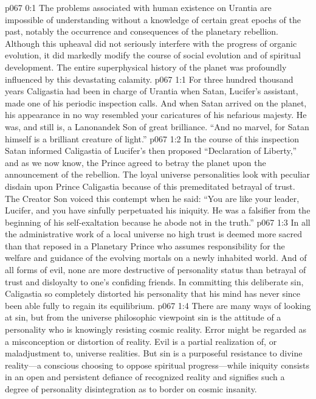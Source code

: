 \author{Melchizedek}
\vs p067 0:1 The problems associated with human existence on Urantia are impossible of understanding without a knowledge of certain great epochs of the past, notably the occurrence and consequences of the planetary rebellion. Although this upheaval did not seriously interfere with the progress of organic evolution, it did markedly modify the course of social evolution and of spiritual development. The entire superphysical history of the planet was profoundly influenced by this devastating calamity.
\vs p067 1:1 For three hundred thousand years Caligastia had been in charge of Urantia when Satan, Lucifer’s assistant, made one of his periodic inspection calls. And when Satan arrived on the planet, his appearance in no way resembled your caricatures of his nefarious majesty. He was, and still is, a Lanonandek Son of great brilliance. “And no marvel, for Satan himself is a brilliant creature of light.”
\vs p067 1:2 In the course of this inspection Satan informed Caligastia of Lucifer’s then proposed “Declaration of Liberty,” and as we now know, the Prince agreed to betray the planet upon the announcement of the rebellion. The loyal universe personalities look with peculiar disdain upon Prince Caligastia because of this premeditated betrayal of trust. The Creator Son voiced this contempt when he said: “You are like your leader, Lucifer, and you have sinfully perpetuated his iniquity. He was a falsifier from the beginning of his self\hyp{}exaltation because he abode not in the truth.”
\vs p067 1:3 In all the administrative work of a local universe no high trust is deemed more sacred than that reposed in a Planetary Prince who assumes responsibility for the welfare and guidance of the evolving mortals on a newly inhabited world. And of all forms of evil, none are more destructive of personality status than betrayal of trust and disloyalty to one’s confiding friends. In committing this deliberate sin, Caligastia so completely distorted his personality that his mind has never since been able fully to regain its equilibrium.
\pc \vs p067 1:4 There are many ways of looking at sin, but from the universe philosophic viewpoint sin is the attitude of a personality who is knowingly resisting cosmic reality. Error might be regarded as a misconception or distortion of reality. Evil is a partial realization of, or maladjustment to, universe realities. But sin is a purposeful resistance to divine reality---a conscious choosing to oppose spiritual progress---while iniquity consists in an open and persistent defiance of recognized reality and signifies such a degree of personality disintegration as to border on cosmic insanity.
